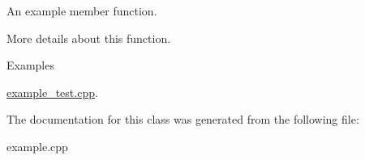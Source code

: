 An example member function. 

More details about this function. \begin{Desc}
\item[Examples]\par
\mbox{\hyperlink{example_test_8cpp-example}{example\+\_\+test.\+cpp}}.\end{Desc}


The documentation for this class was generated from the following file\+:\begin{DoxyCompactItemize}
\item 
example.\+cpp\end{DoxyCompactItemize}
